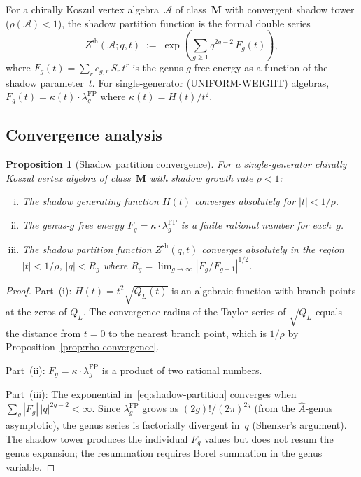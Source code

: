 \documentclass[11pt,reqno]{amsart}
\newtheorem{proposition}[theorem]{Proposition}
\theoremstyle{definition}
\theoremstyle{remark}
\newcommand{\cA}{\mathcal{A}}
\numberwithin{equation}{section}
\begin{document}
For a chirally Koszul vertex algebra~$\cA$ of
class~$\mathbf{M}$ with convergent shadow tower
($\rho(\cA) < 1$), the shadow partition function is the
formal double series
\begin{equation}\label{eq:shadow-partition}
 Z^{\mathrm{sh}}(\cA; q, t)
 \;:=\;
 \exp\!\left(
  \sum_{g \ge 1} q^{2g-2}\, F_g(t)
 \right),
\end{equation}
where $F_g(t) = \sum_{r} c_{g,r}\, S_r\, t^r$ is the
genus-$g$ free energy as a function of the shadow
parameter~$t$. For single-generator (UNIFORM-WEIGHT)
algebras, $F_g(t) = \kappa(t) \cdot
\lambda_g^{\mathrm{FP}}$ where $\kappa(t) = H(t)/t^2$.

\subsection{Convergence
analysis}\label{subsec:partition-convergence}

\begin{proposition}[Shadow partition convergence]
\label{prop:partition-convergence}
For a single-generator chirally Koszul vertex algebra
of class~$\mathbf{M}$ with shadow growth rate
$\rho < 1$:
\begin{enumerate}[(i)]
\item The shadow generating function $H(t)$ converges
 absolutely for $|t| < 1/\rho$.
\item The genus-$g$ free energy
 $F_g = \kappa \cdot \lambda_g^{\mathrm{FP}}$ is a finite
 rational number for each~$g$.
\item The shadow partition function
 $Z^{\mathrm{sh}}(q,t)$ converges absolutely in the region
 $|t| < 1/\rho$, $|q| < R_g$ where
 $R_g = \lim_{g \to \infty} |F_g/F_{g+1}|^{1/2}$.
\end{enumerate}
\end{proposition}

\begin{proof}
Part~(i): $H(t) = t^2\sqrt{Q_L(t)}$ is an algebraic
function with branch points at the zeros of $Q_L$. The
convergence radius of the Taylor series of $\sqrt{Q_L}$
equals the distance from $t = 0$ to the nearest branch
point, which is $1/\rho$ by
Proposition~\ref{prop:rho-convergence}.

Part~(ii): $F_g = \kappa \cdot \lambda_g^{\mathrm{FP}}$
is a product of two rational numbers.

Part~(iii): The exponential in~\eqref{eq:shadow-partition}
converges when $\sum_g |F_g|\, |q|^{2g-2} < \infty$.
Since $\lambda_g^{\mathrm{FP}}$ grows as $(2g)!/(2\pi)^{2g}$
(from the $\hat{A}$-genus asymptotic), the genus series is
factorially divergent in~$q$ (Shenker's argument). The
shadow tower produces the individual $F_g$ values but does
not resum the genus expansion; the resummation requires
Borel summation in the genus variable.
\end{proof}
\end{document}
